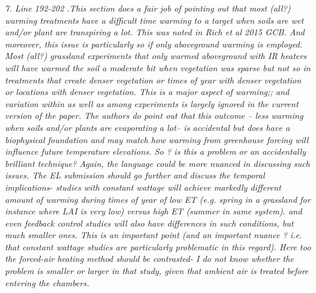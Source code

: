 \documentclass[11pt,a4paper]{letter}
\begin{document}
\begin{letter}{}
\par \emph{7. Line 192-202 .This section does a fair job of pointing out that most (all?) warming treatments have a difficult time warming to a target when soils are wet and/or plant are transpiring a lot. This was noted in Rich et al 2015 GCB. And moreover, this issue is particularly so if only aboveground warming is employed. Most (all?) grassland experiments that only warmed aboveground with IR heaters will have warmed the soil a moderate bit when vegetation was sparse but not so in treatments that create denser vegetation or times of year with denser vegetation or locations with denser vegetation. This is a major aspect of warming;; and variation within as well as among experiments is largely ignored in the current version of the paper. The authors do point out that this outcome -- less warming when soils and/or plants are evaporating a lot-- is accidental but does have a biophysical foundation and may match how warming from greenhouse forcing will influence future temperature elevations. So ? is this a problem or an accidentally brilliant technique? Again, the language could be more nuanced in discussing such issues. The EL submission should go further and discuss the temporal
implications- studies with constant wattage will achieve markedly different amount of warming
during times of year of low ET (e.g. spring in a grassland for instance where LAI is very low)
versus high ET (summer in same system). and even feedback control studies will also have
differences in such conditions, but much smaller ones. This is an important point (and an
important nuance ? i.e. that constant wattage studies are particularly problematic in this
regard). Here too the forced-air heating method should be contrasted- I do not know whether
the problem is smaller or larger in that study, given that ambient air is treated before entering
the chambers.}



\end{letter}
\end{document}
